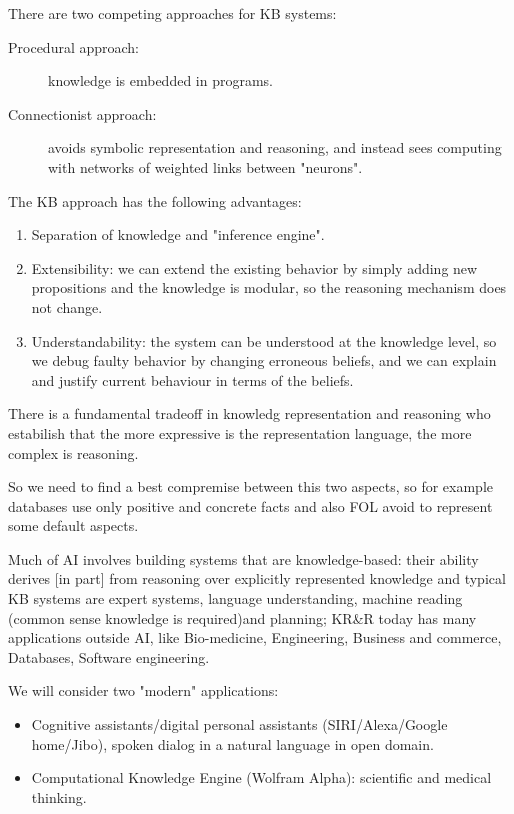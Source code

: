 There are two competing approaches for KB systems:
\begin{description}
    \item [Procedural approach: ] knowledge is embedded in programs.
    \item [Connectionist approach: ] avoids symbolic representation and reasoning, and 
           instead sees computing with networks of weighted links between "neurons".
\end{description}
The KB approach has the following advantages:
\begin{enumerate}
   \item Separation of knowledge and "inference engine".
   \item Extensibility: we can extend the existing behavior by simply adding new 
         propositions and the knowledge is modular, so the reasoning mechanism
         does not change.
   \item Understandability: the system can be understood at the knowledge level,
         so we debug faulty behavior by changing erroneous beliefs, and we can explain
         and justify current behaviour in terms of the beliefs.
\end{enumerate}
There is a fundamental tradeoff in knowledg representation and reasoning who estabilish
that the more expressive is the representation language, the more complex is reasoning.

So we need to find a best compremise between this two aspects, so for example databases
use only positive and concrete facts and also FOL avoid to represent some default aspects.

Much of AI involves building systems that are knowledge-based: their ability derives [in
part] from reasoning over explicitly represented knowledge and typical KB systems are
expert systems, language understanding, machine reading (common sense knowledge is required)and planning; KR\&R today has many applications outside AI, like Bio-medicine,
Engineering, Business and commerce, Databases, Software engineering.

We will consider two "modern" applications:
\begin{itemize}
   \item Cognitive assistants/digital personal assistants (SIRI/Alexa/Google home/Jibo),
	 spoken dialog in a natural language in open domain.
   \item Computational Knowledge Engine (Wolfram Alpha): scientific and medical thinking.
\end{itemize}
